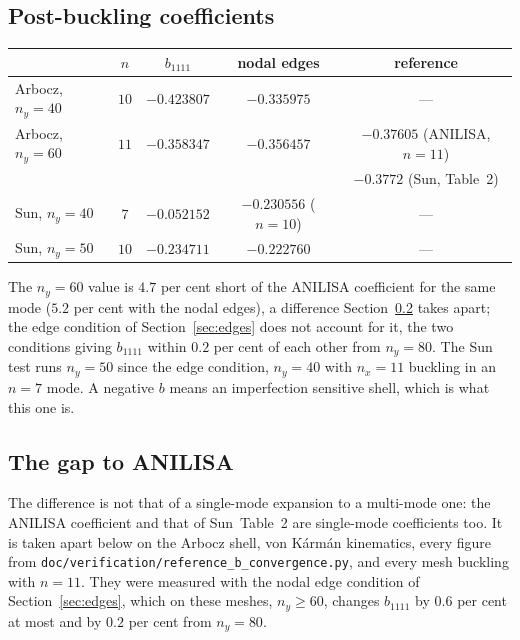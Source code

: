 \documentclass[11pt,a4paper]{article}
\begin{document}
\subsection{Post-buckling coefficients}

\begin{center}
\begin{tabular}{lcccc}
\toprule
 & $n$ & $b_{1111}$ & nodal edges & reference \\
\midrule
Arbocz, $n_y = 40$ & $10$ & $-0.423807$ & $-0.335975$ & --- \\
Arbocz, $n_y = 60$ & $11$ & $-0.358347$ & $-0.356457$ & $-0.37605$ (ANILISA, $n=11$) \\
                        &      &             &             & $-0.3772$ (Sun, Table~2) \\
Sun, $n_y = 40$    & $7$  & $-0.052152$ & $-0.230556$ ($n = 10$) & --- \\
Sun, $n_y = 50$    & $10$ & $-0.234711$ & $-0.222760$ & --- \\
\bottomrule
\end{tabular}
\end{center}

The $n_y = 60$ value is $4.7$ per cent short of the ANILISA coefficient for
the same mode ($5.2$ per cent with the nodal edges), a difference
Section~\ref{sec:gap} takes apart; the edge condition of
Section~\ref{sec:edges} does not account for it, the two conditions giving
$b_{1111}$ within $0.2$ per cent of each other from $n_y = 80$.  The Sun test
runs $n_y = 50$ since the edge condition, $n_y = 40$ with $n_x = 11$ buckling
in an $n = 7$ mode.  A negative
$b$ means an imperfection sensitive shell, which is what this one is.

\subsection{The gap to ANILISA}
\label{sec:gap}

The difference is not that of a single-mode expansion to a multi-mode one:
the ANILISA coefficient and that of Sun~Table~2 are single-mode coefficients
too.  It is taken apart below on the Arbocz shell, von K\'arm\'an kinematics,
every figure from \texttt{doc/verification/reference\_b\_convergence.py}, and
every mesh buckling with $n = 11$.  They were measured with the nodal edge
condition of Section~\ref{sec:edges}, which on these meshes, $n_y \ge 60$,
changes $b_{1111}$ by $0.6$ per cent at most and by $0.2$ per cent from
$n_y = 80$.
\end{document}
